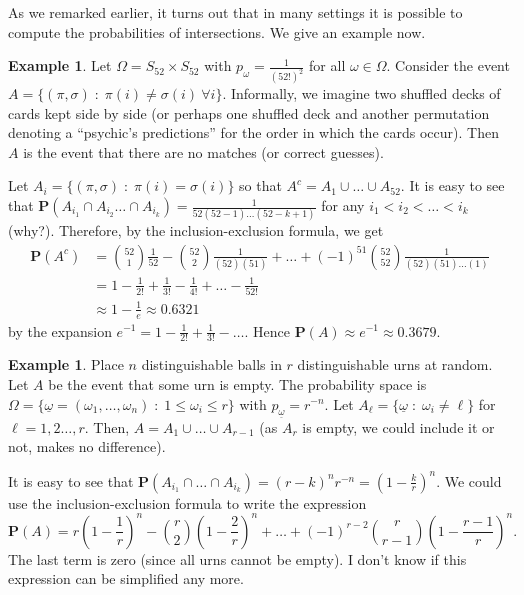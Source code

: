 \documentclass[preprint,  11pt]{amsart}
\theoremstyle{plain} %
\theoremstyle{definition} %
\newtheorem{example}[theorem]{Example}
\begin{document}
As we remarked earlier,  it turns out that in many settings it is possible to compute the probabilities of intersections. We give an example now. 
\begin{example} \label{eg:matchingnumerisnearlypoisson} Let $\Omega=S_{52}\times S_{52}$ with $p_{\omega}=\frac{1}{(52!)^{2}}$ for all $\omega \in \Omega$. Consider the event $A=\{(\pi,{\sigma}){\; : \;} \pi(i)\not={\sigma}(i) \ \forall i\}$. Informally, we imagine two shuffled decks of cards kept side by side (or perhaps one shuffled deck and another permutation denoting a  ``psychic's predictions'' for the order in which the cards occur). Then $A$ is the event that there are no matches (or correct guesses).

Let $A_{i}=\{(\pi,{\sigma}){\; : \;} \pi(i)={\sigma}(i)\}$ so that $A^{c}=A_{1}\cup \ldots \cup A_{52}$. It is easy to see that $\mathbf{P}(A_{i_{1}}\cap A_{i_{2}}\ldots \cap A_{i_{k}})=\frac{1}{52(52-1)\ldots (52-k+1)}$ for any $i_{1}<i_{2}<\ldots <i_{k}$ (why?). Therefore, by the inclusion-exclusion formula, we get
\begin{align*}
\mathbf{P}(A^{c}) &=  \binom{52}{1}\frac{1}{52}-\binom{52}{2}\frac{1}{(52)(51)} +  \ldots + (-1)^{51} \binom{52}{52}\frac{1}{(52)(51)\ldots (1)}\\
&= 1-\frac{1}{2!}+\frac{1}{3!}-\frac{1}{4!}+\ldots -\frac{1}{52!} \\
&\approx 1-\frac{1}{e} \approx 0.6321
\end{align*}
by the expansion $e^{-1}=1-\frac{1}{2!}+\frac{1}{3!}-\ldots $. Hence $\mathbf{P}(A)\approx e^{-1}\approx 0.3679$.
\end{example} 
\begin{example}\label{eg:probofemptyurn2} Place $n$ distinguishable balls in $r$ distinguishable urns at random. Let $A$ be the event that some urn is empty. The probability space is $\Omega=\{\underline{\omega}=(\omega_{1},\ldots,\omega_{n}){\; : \;} 1\le \omega_{i}\le r\}$ with $p_{\underline{\omega}}=r^{-n}$. Let $A_{\ell}=\{\underline{\omega}{\; : \;} \omega_{i}\not=\ell\}$ for $\ell=1,2\ldots ,r$. Then, $A=A_{1}\cup \ldots \cup A_{r-1}$ (as $A_{r}$ is empty, we could include it or not, makes no difference).

It is easy to see that $\mathbf{P}(A_{i_{1}}\cap \ldots \cap A_{i_{k}})=(r-k)^{n}r^{-n}=(1-\frac{k}{r})^{n}$. We could use the inclusion-exclusion formula to write the expression
$$
\mathbf{P}(A)=r\left(1-\frac{1}{r}\right)^{n}-\binom{r}{2}\left(1-\frac{2}{r}\right)^{n}+\ldots +(-1)^{r-2}\binom{r}{r-1}\left(1-\frac{r-1}{r}\right)^{n}.
$$
The last term is zero (since all urns cannot be empty). I don't know if this expression can be simplified any more.
\end{example}
\end{document}

